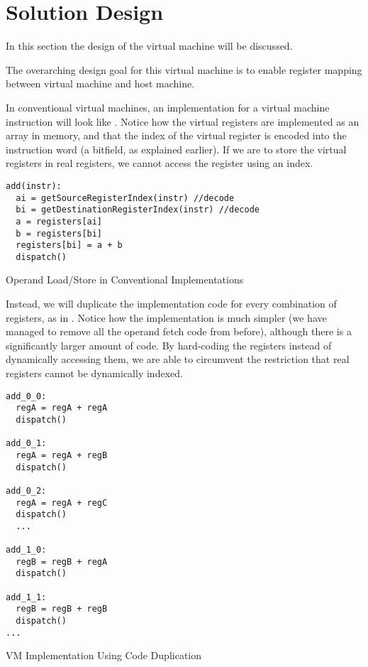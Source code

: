 \chapter{Solution Design}
	In this section the design of the virtual machine will be discussed. 
	
	
	The overarching design goal for this virtual machine is to enable register mapping between virtual machine and host machine.
	
	In conventional virtual machines, an implementation for a virtual machine instruction will look like . Notice how the virtual registers are implemented as an array in memory, and that the index of the virtual register is encoded into the instruction word (a bitfield, as explained earlier). If we are to store the virtual registers in real registers, we cannot access the register using an index.
	
	
	
	\begin{myfigure}
		\begin{lstlisting}
add(instr):
  ai = getSourceRegisterIndex(instr) //decode
  bi = getDestinationRegisterIndex(instr) //decode
  a = registers[ai]
  b = registers[bi]
  registers[bi] = a + b
  dispatch()
		\end{lstlisting}
		\caption{Operand Load/Store in Conventional Implementations}
		\label{fig:operandfetch}
	\end{myfigure}
	
	Instead, we will duplicate the implementation code for every combination of registers, as in . Notice how the implementation is much simpler (we have managed to remove all the operand fetch code from before), although there is a significantly larger amount of code. By hard-coding the registers instead of dynamically accessing them, we are able to circumvent the restriction that real registers cannot be dynamically indexed.
	
	\begin{myfigure}
		\begin{lstlisting}
add_0_0:
  regA = regA + regA
  dispatch()

add_0_1:
  regA = regA + regB
  dispatch()

add_0_2:
  regA = regA + regC
  dispatch()
  ...

add_1_0:
  regB = regB + regA
  dispatch()

add_1_1:
  regB = regB + regB
  dispatch()
...		
		\end{lstlisting}
		\caption{VM Implementation Using Code Duplication}
		\label{fig:dupimplementation}
	\end{myfigure}
	
